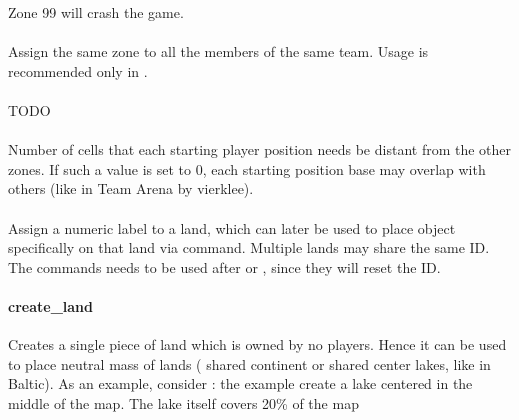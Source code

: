 \begin{appendices}
    \begin{attention}
        Zone 99 will crash the game.
    \end{attention}

    \paragraph{}

    Assign the same zone to all the members of the same team. Usage is recommended only in .

    \paragraph{}

    TODO

    \paragraph{}
    Number of cells that each starting player position needs be distant from the other zones. If such a value is set to 0, each starting position base may overlap with others (like in Team Arena by vierklee).

    \paragraph{}

    \paragraph{}

    Assign a numeric label to a land, which can later be used to place object specifically on that land via  command. Multiple lands may share the same ID. The commands needs to be used after  or , since they will reset the ID.

    \paragraph{create\_land}

    Creates a single piece of land which is owned by no players. Hence it can be used to place neutral mass of lands (\eg{} shared continent or shared{} center lakes, like in Baltic).
    As an example, consider : the example create a lake centered in the middle of the map. The lake itself covers 20\% of the map


\end{appendices}
